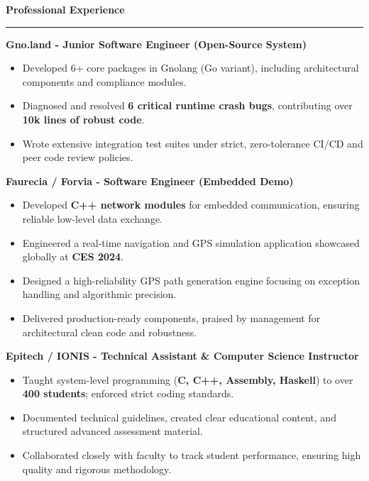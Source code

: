 \documentclass[9pt]{extarticle}
\begin{document}
\par\vspace{5pt}


{\large\bfseries Professional Experience}
\par\vspace{-8pt}
\rule{\linewidth}{0.4pt}
\par\vspace{5pt}

{\bfseries Gno.land - Junior Software Engineer (Open-Source System)}
\begin{itemize}[noitemsep, topsep=0pt]
    \item Developed 6+ core packages in Gnolang (Go variant), including architectural components and compliance modules.
    \item Diagnosed and resolved {\bfseries 6 critical runtime crash bugs}, contributing over {\bfseries 10k lines of robust code}.
    \item Wrote extensive integration test suites under strict, zero-tolerance CI/CD and peer code review policies.
\end{itemize}

\par\vspace{5pt}

{\bfseries Faurecia / Forvia - Software Engineer (Embedded Demo)}
\begin{itemize}[noitemsep, topsep=0pt]
    \item Developed {\bfseries C++ network modules} for embedded communication, ensuring reliable low-level data exchange.
    \item Engineered a real-time navigation and GPS simulation application showcased globally at {\bfseries CES 2024}.
    \item Designed a high-reliability GPS path generation engine focusing on exception handling and algorithmic precision.
    \item Delivered production-ready components, praised by management for architectural clean code and robustness.
\end{itemize}

\par\vspace{5pt}

{\bfseries Epitech / IONIS - Technical Assistant \& Computer Science Instructor}
\begin{itemize}[noitemsep, topsep=0pt]
    \item Taught system-level programming ({\bfseries C, C++, Assembly, Haskell}) to over {\bfseries 400 students}; enforced strict coding standards.
    \item Documented technical guidelines, created clear educational content, and structured advanced assessment material.
    \item Collaborated closely with faculty to track student performance, ensuring high quality and rigorous methodology.
\end{itemize}
\end{document}
